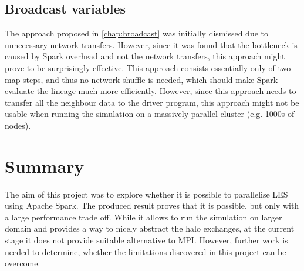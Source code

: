 \documentclass{l4proj}
\begin{document}
\subsection{Broadcast variables}
The approach proposed in \autoref{chap:broadcast} was initially dismissed due to 
unnecessary network transfers. However, since it was found that the bottleneck 
is caused by Spark overhead and not the network transfers, this approach
might prove to be surprisingly effective. This approach consists essentially only 
of two map steps, and thus no network shuffle is needed, which should make Spark
evaluate the lineage much more efficiently. However, since this approach needs
to transfer all the neighbour data to the driver program, this approach might
not be usable when running the simulation on a massively parallel cluster (e.g. 1000s of nodes).

\section{Summary}

The aim of this project was to explore whether it is possible to parallelise 
LES using Apache Spark. The produced result proves that it is possible, but only 
with a large performance trade off. While it allows to run the simulation on larger
domain and provides a way to nicely abstract the halo exchanges, at the current stage
it does not provide suitable alternative to MPI. However, further work is needed
to determine, whether the limitations discovered in this project can be overcome.
\end{document}
